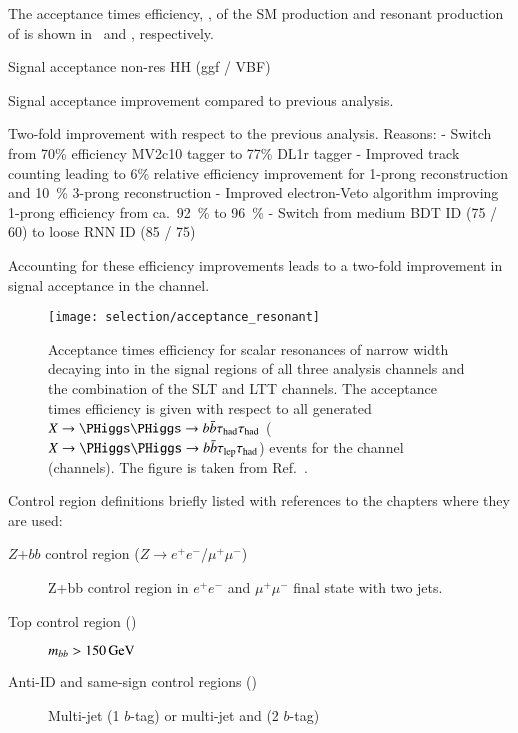 The acceptance times efficiency, \AccTimesEff, of the SM \HH
production and resonant production of \HH is shown
in~ and
, respectively.

Signal acceptance non-res HH (ggf / VBF)

Signal acceptance improvement compared to previous analysis.

Two-fold improvement with respect to the previous analysis. Reasons:
- Switch from 70\% efficiency MV2c10 tagger to 77\% DL1r tagger
- Improved \tauhadvis track counting leading to 6\% relative efficiency improvement for 1-prong \tauhadvis reconstruction and \SI{10}{\percent} 3-prong \tauhadvis reconstruction
- Improved electron-Veto algorithm improving 1-prong \tauhadvis efficiency from ca.\ \SI{92}{\percent} to \SI{96}{\percent}
- Switch from medium BDT ID (75 / 60) to loose RNN ID (85 / 75)

Accounting for these efficiency improvements leads to a two-fold improvement in signal acceptance in the \hadhad channel.



\begin{figure}[htbp]
  \centering

  \texttt{[image: selection/acceptance\_resonant]}

  \caption{Acceptance times efficiency for scalar resonances of narrow
    width decaying into \HH in the signal regions of all three
    analysis channels and the combination of the \lephad SLT and LTT
    channels. The acceptance times efficiency is given with respect to
    all generated $X \to \HH \to \bbbar\hadhad$
    ($X \to \HH \to \bbbar\lephad$) events for the \hadhad channel
    (\lephad channels). The figure is taken from
    Ref.~\cite{ATLAS-CONF-2021-030}.}%
  \label{fig:signal_acceptance_resonant}

\end{figure}

Control region definitions briefly listed with references to the
chapters where they are used:
\begin{description}

\item[$Z$+$bb$ control region ($Z \to e^+e^-$/$\mu^+\mu^-$)] Z+bb
  control region in $e^+e^-$ and $\mu^+\mu^-$ final state with two
  \btagged jets.

\item[Top control region (\lephad)] $m_{bb} > \SI{150}{\ensuremath{\text{GeV}}}$

\item[Anti-ID and same-sign control regions (\hadhad)] Multi-jet (1
  $b$-tag) or multi-jet and \ttbar (2 $b$-tag)

\item[]

\end{description}


